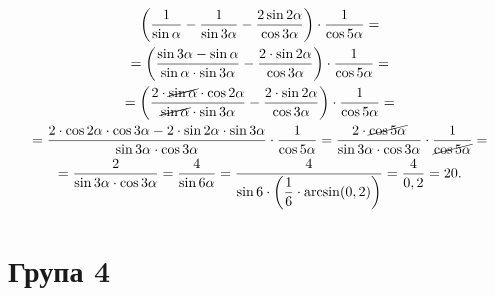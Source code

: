 \begin{multline*}
\left(\dfrac{1}{\sin\alpha}-\dfrac{1}{\sin3\alpha}-\dfrac{2\sin2\alpha}{\cos3\alpha}\right)\cdot\dfrac{1}{\cos5\alpha}=\\
=\left(\dfrac{\sin3\alpha-\sin\alpha}{\sin\alpha\cdot\sin3\alpha}-\dfrac{2\cdot\sin2\alpha}{\cos3\alpha}\right)\cdot\dfrac{1}{\cos5\alpha}=\\
=\left(\dfrac{2\cdot\cancel{\sin\alpha}\cdot\cos2\alpha}{\cancel{\sin\alpha}\cdot\sin3\alpha}-\dfrac{2\cdot\sin2\alpha}{\cos3\alpha}\right)\cdot\dfrac{1}{\cos5\alpha}=\\
=\dfrac{2\cdot\cos2\alpha\cdot\cos3\alpha-2\cdot\sin2\alpha\cdot\sin3\alpha}{\sin3\alpha\cdot\cos3\alpha}\cdot\dfrac{1}{\cos5\alpha}=
\dfrac{2\cdot\cancel{\cos5\alpha}}{\sin3\alpha\cdot\cos3\alpha}\cdot\dfrac{1}{\cancel{\cos5\alpha}}=\\
=\dfrac{2}{\sin3\alpha\cdot\cos3\alpha}=
\dfrac{4}{\sin6\alpha}=
\dfrac{4}{\sin6\cdot\left(\dfrac{1}{6}\cdot\arcsin(0,2)\right)}=
\dfrac{4}{0,2}=20.
\end{multline*}

\section*{Група 4}
